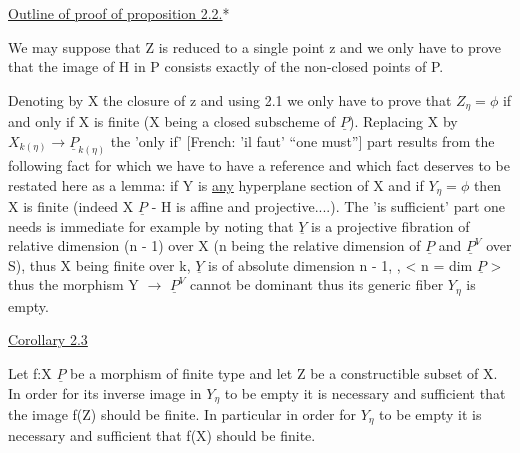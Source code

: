 
\uline{Outline of proof of proposition 2.2.}*

We may suppose that Z is reduced to a single point z and we
only have to prove that the image of H in P consists exactly of
the non-closed points of P.

Denoting by X the closure of z and using 2.1 we only have to
prove that $Z_{\eta} = \phi$ if and only if X is finite (X being a closed
subscheme of $\underline{P}$).  Replacing X by $X_{k(\eta)} \to \underline{P}_{k(\eta)}$ the 'only if'
[French:  'il faut' ``one must''] part results from the following
fact for which we have to have a reference and which fact deserves
to be restated here as a lemma:  if Y is \uline{any} hyperplane section of
X and if $Y_{\eta} = \phi$ then X is finite (indeed X \quad\quad $\underline{P}$ - H is affine and
projective....).  The 'is sufficient' part one needs is immediate
for example by noting that $\underline{Y}$ is a projective fibration of relative
dimension (n - 1) over X (n being the relative dimension of $\underline{P}$ and
$\underline{P}^{V}$ over S), thus X being finite over k, $\underline{Y}$ is of absolute dimension
n - 1, , < n = dim $\underline{P}$ > thus the morphism Y $\to$ $\underline{P}^{V}$ cannot be dominant
thus its generic fiber $Y_{\eta}$ is empty.

\uline{Corollary 2.3}

Let f:X \quad\quad\quad\quad $\underline{P}$ be a morphism of finite type and let Z be
a constructible subset of X.  In order for its inverse image in $Y_{\eta}$
to be empty it is necessary and sufficient that the image f(Z)
should be finite.  In particular in order for $Y_{\eta}$ to be empty it is
necessary and sufficient that f(X) should be finite.

